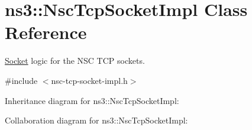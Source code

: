\hypertarget{classns3_1_1NscTcpSocketImpl}{}\section{ns3\+:\+:Nsc\+Tcp\+Socket\+Impl Class Reference}
\label{classns3_1_1NscTcpSocketImpl}


\hyperlink{classns3_1_1Socket}{Socket} logic for the N\+SC T\+CP sockets.  




{\ttfamily \#include $<$nsc-\/tcp-\/socket-\/impl.\+h$>$}



Inheritance diagram for ns3\+:\+:Nsc\+Tcp\+Socket\+Impl\+:


Collaboration diagram for ns3\+:\+:Nsc\+Tcp\+Socket\+Impl\+:
